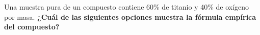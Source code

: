 Una muestra pura de un compuesto contiene 60\% de titanio y 40\% de oxígeno por masa.
\textbf{¿Cuál de las siguientes opciones muestra la fórmula empírica del compuesto?}

\begin{choices}
    \choice  {}
    \choice  {}
    \choice  {}
    \choice  {}
\end{choices}